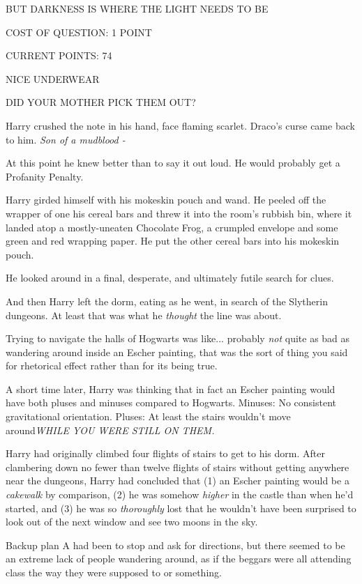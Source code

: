 BUT DARKNESS IS WHERE THE LIGHT NEEDS TO BE

COST OF QUESTION: 1 POINT

CURRENT POINTS: 74

NICE UNDERWEAR

DID YOUR MOTHER PICK THEM OUT?

Harry crushed the note in his hand, face flaming scarlet. Draco's curse
came back to him. \emph{Son of a mudblood -}

At this point he knew better than to say it out loud. He would probably
get a Profanity Penalty.

Harry girded himself with his mokeskin pouch and wand. He peeled off the
wrapper of one his cereal bars and threw it into the room's rubbish bin,
where it landed atop a mostly-uneaten Chocolate Frog, a crumpled
envelope and some green and red wrapping paper. He put the other cereal
bars into his mokeskin pouch.

He looked around in a final, desperate, and ultimately futile search for
clues.

And then Harry left the dorm, eating as he went, in search of the
Slytherin dungeons. At least that was what he \emph{thought} the line
was about.

Trying to navigate the halls of Hogwarts was like... probably
\emph{not} quite as bad as wandering around inside an Escher painting,
that was the sort of thing you said for rhetorical effect rather than
for its being true.

A short time later, Harry was thinking that in fact an Escher painting
would have both pluses and minuses compared to Hogwarts. Minuses: No
consistent gravitational orientation. Pluses: At least the stairs
wouldn't move around\emph{WHILE YOU WERE STILL ON THEM.}

Harry had originally climbed four flights of stairs to get to his dorm.
After clambering down no fewer than twelve flights of stairs without
getting anywhere near the dungeons, Harry had concluded that (1) an
Escher painting would be a \emph{cakewalk} by comparison, (2) he was
somehow \emph{higher} in the castle than when he'd started, and (3) he
was so \emph{thoroughly} lost that he wouldn't have been surprised to
look out of the next window and see two moons in the sky.

Backup plan A had been to stop and ask for directions, but there seemed
to be an extreme lack of people wandering around, as if the beggars were
all attending class the way they were supposed to or something.

